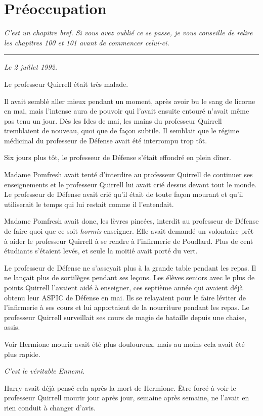 
\chapter{Préoccupation}

\emph{C'est un chapitre bref. Si vous avez oublié ce se passe, je vous conseille de relire les chapitres 100 et 101 avant de commencer celui-ci.} 
\par\noindent\rule{\textwidth}{0.4pt}
\emph{Le 2 juillet 1992.} 

Le professeur Quirrell était très malade.

Il avait semblé aller mieux pendant un moment, après avoir bu le sang de licorne en mai, mais l'intense aura de pouvoir qui l'avait ensuite entouré n'avait même pas tenu un jour. Dès les Ides de mai, les mains du professeur Quirrell tremblaient de nouveau, quoi que de façon subtile. Il semblait que le régime médicinal du professeur de Défense avait été interrompu trop tôt.

Six jours plus tôt, le professeur de Défense s'était effondré en plein dîner.

Madame Pomfresh avait tenté d'interdire au professeur Quirrell de continuer ses enseignements et le professeur Quirrell lui avait crié dessus devant tout le monde. Le professeur de Défense avait crié qu'il était de toute façon mourant et qu'il utiliserait le temps qui lui restait comme il l'entendait.

Madame Pomfresh avait donc, les lèvres pincées, interdit au professeur de Défense de faire quoi que ce soit \emph{hormis}  enseigner. Elle avait demandé un volontaire prêt à aider le professeur Quirrell à se rendre à l'infirmerie de Poudlard. Plus de cent étudiants s'étaient levés, et seule la moitié avait porté du vert.

Le professeur de Défense ne s'asseyait plus à la grande table pendant les repas. Il ne lançait plus de sortilèges pendant ses leçons. Les élèves seniors avec le plus de points Quirrell l'avaient aidé à enseigner, ces septième année qui avaient déjà obtenu leur ASPIC de Défense en mai. Ils se relayaient pour le faire léviter de l'infirmerie à ses cours et lui apportaient de la nourriture pendant les repas. Le professeur Quirrell surveillait ses cours de magie de bataille depuis une chaise, assis.

Voir Hermione mourir avait été plus douloureux, mais au moins cela avait été plus rapide.

\emph{C'est le véritable Ennemi.} 

Harry avait déjà pensé cela après la mort de Hermione. Être forcé à voir le professeur Quirrell mourir jour après jour, semaine après semaine, ne l'avait en rien conduit à changer d'avis.

